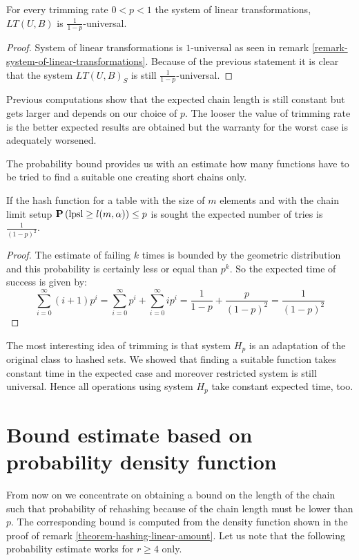 \begin{corollary}
\label{corollary-trimming-linear}
For every trimming rate $0 < p < 1$ the system of linear transformations, $LT(U, B)$ is $\frac{1}{1 - p}$-universal.
\end{corollary}
\begin{proof}
System of linear transformations is $1$-universal as seen in remark \ref{remark-system-of-linear-transformations}. Because of the previous statement it is clear that the system $LT(U, B)_S$ is still $\frac{1}{1 - p}$-universal.
\end{proof}

Previous computations show that the expected chain length is still constant but gets larger and depends on our choice of $p$. The looser the value of trimming rate is the better expected results are obtained but the warranty for the worst case is adequately worsened. 

The probability bound provides us with an estimate how many functions have to be tried to find a suitable one creating short chains only.

\begin{lemma}
\label{lemma-linear-transformations-tries}
If the hash function for a table with the size of $m$ elements and with the chain limit setup $\mathbf{P}\left(\mathrm{lpsl} \geq l(m, \alpha)\right) \leq p$ is sought the expected number of tries is $\frac{1}{(1 - p)^2}$.
\end{lemma}
\begin{proof}
The estimate of failing $k$ times is bounded by the geometric distribution and this probability is certainly less or equal than $p^k$. So the expected time of success is given by:
\begin{displaymath}
\sum_{i = 0}^{\infty} (i + 1)p^i = \sum_{i = 0}^{\infty}p^i + \sum_{i = 0}^{\infty}ip^i = \frac{1}{1 - p} + \frac{p}{(1- p)^2} = \frac{1}{(1 - p)^2}
\end{displaymath}
\end{proof}

The most interesting idea of trimming is that system $H_p$ is an adaptation of the original class to hashed sets. We showed that finding a suitable function takes constant time in the expected case and moreover restricted system is still universal. Hence all operations using system $H_p$ take constant expected time, too.

\section{Bound estimate based on probability density function}
\label{section-linear-systems-linear-amount-constant-estimate}
From now on we concentrate on obtaining a bound on the length of the chain such that probability of rehashing because of the chain length must be lower than $p$. The corresponding bound is computed from the density function shown in the proof of remark \ref{theorem-hashing-linear-amount}. Let us note that the following probability estimate works for $r \geq 4$ only. 

